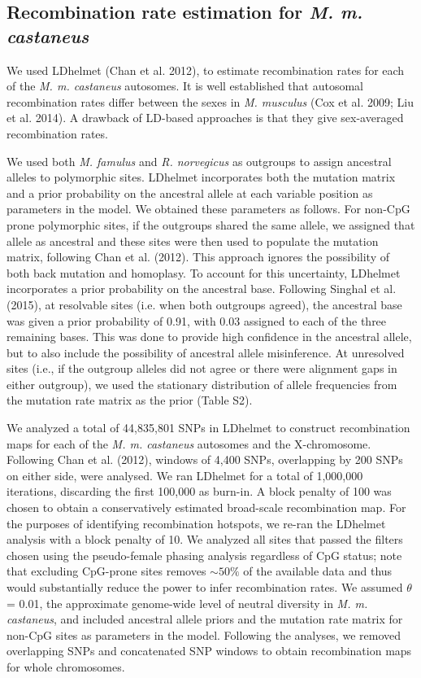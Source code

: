 \subsection{Recombination rate estimation for \emph{\emph{M. m. castaneus}}}
        	
        We used LDhelmet (Chan et al. 2012), to estimate recombination rates for each of the \emph{M. m. castaneus} autosomes. It is well established that autosomal recombination rates differ between the sexes in \emph{M. musculus} (Cox et al. 2009; Liu et al. 2014). A drawback of LD-based approaches is that they give sex-averaged recombination rates. 
 
        	We used both \emph{M. famulus} and \emph{R. norvegicus} as outgroups to assign ancestral alleles to polymorphic sites. LDhelmet incorporates both the mutation matrix and a prior probability on the ancestral allele at each variable position as parameters in the model. We obtained these parameters as follows. For non-CpG prone polymorphic sites, if the outgroups shared the same allele, we assigned that allele as ancestral and these sites were then used to populate the mutation matrix, following Chan et al. (2012). This approach ignores the possibility of both back mutation and homoplasy. To account for this uncertainty, LDhelmet incorporates a prior probability on the ancestral base. Following Singhal et al. (2015), at resolvable sites (i.e. when both outgroups agreed), the ancestral base was given a prior probability of 0.91, with 0.03 assigned to each of the three remaining bases. This was done to provide high confidence in the ancestral allele, but to also include the possibility of ancestral allele misinference. At unresolved sites (i.e., if the outgroup alleles did not agree or there were alignment gaps in either outgroup), we used the stationary distribution of allele frequencies from the mutation rate matrix as the prior (Table S2).
 
We analyzed a total of 44,835,801 SNPs in LDhelmet to construct recombination maps for each of the \emph{M. m. castaneus} autosomes and the X-chromosome. Following Chan et al. (2012), windows of 4,400 SNPs, overlapping by 200 SNPs on either side, were analysed. We ran LDhelmet for a total of 1,000,000 iterations, discarding the first 100,000 as burn-in. A block penalty of 100 was chosen to obtain a conservatively estimated broad-scale recombination map. For the purposes of identifying recombination hotspots, we re-ran the LDhelmet analysis with a block penalty of 10. We analyzed all sites that passed the filters chosen using the pseudo-female phasing analysis regardless of CpG status; note that excluding CpG-prone sites removes $\sim50\%$ of the available data and thus would substantially reduce the power to infer recombination rates. We assumed $\theta$ = 0.01, the approximate genome-wide level of neutral diversity in \emph{M. m. castaneus}, and included ancestral allele priors and the mutation rate matrix for non-CpG sites as parameters in the model. Following the analyses, we removed overlapping SNPs and concatenated SNP windows to obtain recombination maps for whole chromosomes. 

